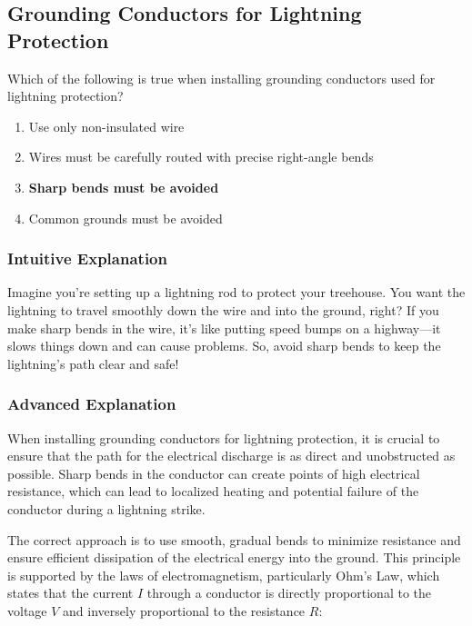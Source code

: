 \subsection{Grounding Conductors for Lightning Protection}
\label{T0B10}

\begin{tcolorbox}[colback=gray!10!white,colframe=black!75!black,title=T0B10]
Which of the following is true when installing grounding conductors used for lightning protection?
\begin{enumerate}[label=\Alph*]
    \item Use only non-insulated wire
    \item Wires must be carefully routed with precise right-angle bends
    \item \textbf{Sharp bends must be avoided}
    \item Common grounds must be avoided
\end{enumerate}
\end{tcolorbox}

\subsubsection{Intuitive Explanation}
Imagine you're setting up a lightning rod to protect your treehouse. You want the lightning to travel smoothly down the wire and into the ground, right? If you make sharp bends in the wire, it's like putting speed bumps on a highway—it slows things down and can cause problems. So, avoid sharp bends to keep the lightning's path clear and safe!

\subsubsection{Advanced Explanation}
When installing grounding conductors for lightning protection, it is crucial to ensure that the path for the electrical discharge is as direct and unobstructed as possible. Sharp bends in the conductor can create points of high electrical resistance, which can lead to localized heating and potential failure of the conductor during a lightning strike. 

The correct approach is to use smooth, gradual bends to minimize resistance and ensure efficient dissipation of the electrical energy into the ground. This principle is supported by the laws of electromagnetism, particularly Ohm's Law, which states that the current \( I \) through a conductor is directly proportional to the voltage \( V \) and inversely proportional to the resistance \( R \):

